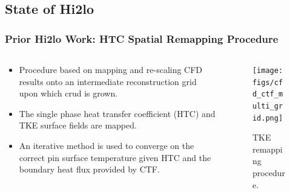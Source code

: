 \documentclass[t, pdftex]{beamer}
\begin{document}
\subsection*{State of Hi2lo}
\begin{frame}[shrink=10]
\frametitle{Prior Hi2lo Work: HTC Spatial Remapping Procedure}
\begin{columns}
    \begin{column}{0.5\textwidth}
        \begin{itemize}
            \item Procedure based on mapping and re-scaling CFD results onto an intermediate reconstruction grid upon which crud is grown.
            \item The single phase heat transfer coefficient (HTC) and TKE surface fields are mapped.
            \item An iterative method is used to converge on the correct pin surface temperature given HTC and the boundary heat flux provided by CTF.
        \end{itemize}
    \end{column}
    \begin{column}{0.5\textwidth}  %
        \begin{center}
            \begin{figure}
                \texttt{[image: figs/cfd\_ctf\_multi\_grid.png]}
                \caption{\centering TKE remapping procedure. \cite{salko17}}      
            \end{figure}
        \end{center}
    \end{column}
\end{columns}
\vspace{-12pt}
\end{frame}

\end{document}
